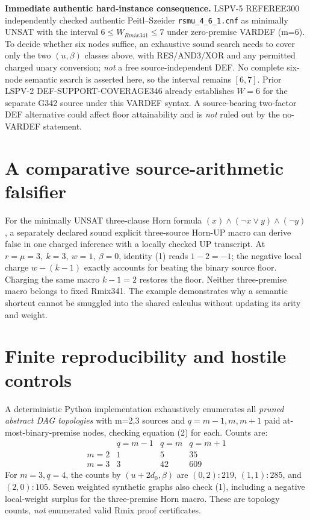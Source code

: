 \documentclass[11pt]{article}
\begin{document}
\noindent\textbf{Immediate authentic hard-instance consequence.} LSPV-5 REFEREE300 independently checked authentic Peitl--Szeider \texttt{rsmu\_4\_6\_1.cnf} as minimally UNSAT with the interval $6\le W_{Rmix341}\le7$ under zero-premise VARDEF (m=6). To decide whether six nodes suffice, an exhaustive sound search needs to cover only the two $(u,\beta)$ classes above, with RES/AND3/XOR and any permitted charged unary conversion; \emph{not} a free source-independent DEF. No complete six-node semantic search is asserted here, so the interval remains $[6,7]$. Prior LSPV-2 DEF-SUPPORT-COVERAGE346 already establishes $W=6$ for the separate G342 source under this VARDEF syntax. A source-bearing two-factor DEF alternative could affect floor attainability and is \emph{not} ruled out by the no-VARDEF statement.

\section*{A comparative source-arithmetic falsifier}
For the minimally UNSAT three-clause Horn formula $(x)\land(\neg x\lor y)\land(\neg y)$, a separately declared sound explicit three-source Horn-UP macro can derive false in one charged inference with a locally checked UP transcript. At $r=\mu=3,\ k=3,\ w=1,\ \beta=0$, identity (1) reads $1-2=-1$; the negative local charge $w-(k-1)$ exactly accounts for beating the binary source floor. Charging the same macro $k-1=2$ restores the floor. Neither three-premise macro belongs to fixed Rmix341. The example demonstrates why a semantic shortcut cannot be smuggled into the shared calculus without updating its arity and weight.

\section*{Finite reproducibility and hostile controls}
A deterministic Python implementation exhaustively enumerates all \emph{pruned abstract DAG topologies} with m=2,3 sources and $q=m-1,m,m+1$ paid at-most-binary-premise nodes, checking equation (2) for each. Counts are:
\[
\begin{array}{c|rrr}
& q=m-1&q=m&q=m+1\\\hline
m=2&1&5&35\\
m=3&3&42&609
\end{array}
\]
For $m=3,q=4$, the counts by $(u+2d_0,\beta)$ are $(0,2):219$, $(1,1):285$, and $(2,0):105$. Seven weighted synthetic graphs also check (1), including a negative local-weight surplus for the three-premise Horn macro. These are topology counts, \emph{not} enumerated valid Rmix proof certificates.
\end{document}
